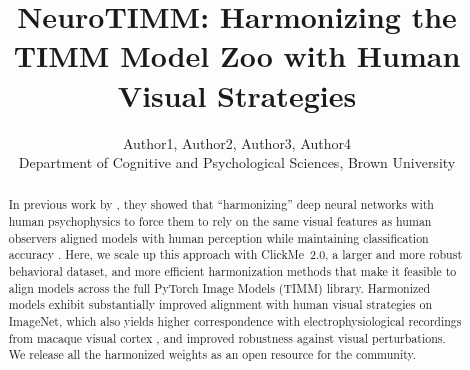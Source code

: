 \documentclass[submission]{ccn}
\title{NeuroTIMM: Harmonizing the TIMM Model Zoo with Human Visual Strategies}
\author{Author1, Author2, Author3, Author4 \\
  Department of Cognitive and Psychological Sciences, Brown University \\
  \email{example@brown.edu}}
\begin{document}
\maketitle


\begin{abstract}

  In previous work by \citep{FelRodriguezLinsleySerre2022}, they showed that ``harmonizing'' deep neural networks with human psychophysics to force them to rely on the same visual features as human observers aligned models with human perception while maintaining classification accuracy \citep{FelRodriguezLinsleySerre2022, LinsleyRodriguezFelEtAl2023}. Here, we scale up this approach with ClickMe~2.0, a larger and more robust behavioral dataset, and more efficient harmonization methods that make it feasible to align models across the full PyTorch Image Models (TIMM) library. Harmonized models exhibit substantially improved alignment with human visual strategies on ImageNet, which also yields higher correspondence with electrophysiological recordings from macaque visual cortex \citep{Arcaro}, and improved robustness against visual perturbations. We release all the harmonized weights as an open resource for the community.
\end{abstract}
\end{document}
